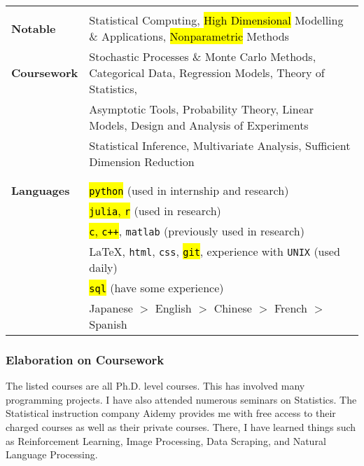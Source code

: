 \documentclass[utf8,letterpaper,oneside]{article}
\begin{document}
\begin{center}
\begin{tabular}{l l}
                           &                                                                                                               \\
  \textbf{Notable}         & Statistical Computing, \hl{High Dimensional} Modelling \& Applications, \hl{Nonparametric} Methods            \\
  \textbf{Coursework}      & Stochastic Processes \& Monte Carlo Methods, Categorical Data, Regression Models, Theory of Statistics,       \\
                           & Asymptotic Tools, Probability Theory, Linear Models, Design and Analysis of Experiments                       \\
                           & Statistical Inference, Multivariate Analysis, Sufficient Dimension Reduction                                  \\
                           &                                                                                                               \\ \hline
                           &                                                                                                               \\
  \textbf{Languages}       & \hl{\texttt{python}} (used in internship and research)                                                        \\
                           & \hl{\texttt{julia}, \texttt{r}} (used in research)                                                            \\
                           & \hl{\texttt{c}, \texttt{c++}}, \texttt{matlab} (previously used in research)                                  \\
                           & \LaTeX, \texttt{html}, \texttt{css}, \hl{\texttt{git}}, experience with \texttt{UNIX} (used daily)            \\
                           & \hl{\texttt{sql}} (have some experience)                                                                      \\
                           & Japanese $>$ English $>$ Chinese $>$ French $>$ Spanish                                                       \\
 \end{tabular}
\end{center}
\newpage
\subsubsection*{Elaboration on Coursework}
The listed courses are all Ph.D. level courses. This has involved many programming projects. I have also attended numerous seminars on Statistics. The Statistical instruction company Aidemy provides me with free access to their charged courses as well as their private courses. There, I have learned things such as  Reinforcement Learning, Image Processing, Data Scraping, and Natural Language Processing.
\end{document}
